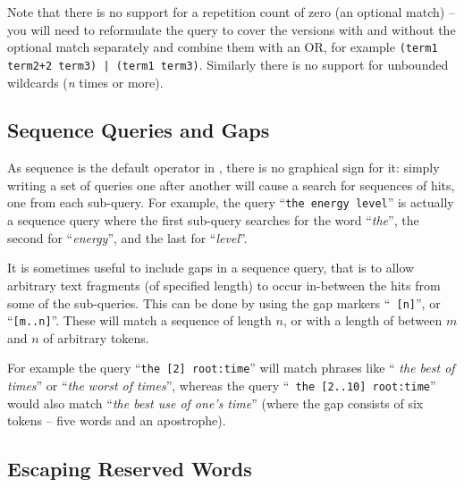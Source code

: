 Note that there is no support for a repetition count of zero (an optional
match) -- you will need to reformulate the query to cover the versions with and
without the optional match separately and combine them with an OR, for example
{\tt (term1 term2+2 term3) | (term1 term3)}.  Similarly there is no support for
unbounded wildcards ({\em n} times or more).

\subsection{Sequence Queries and Gaps}\label{sec:sequence-query}

As sequence is the default operator in \Mimir, there is no graphical sign for
it: simply writing a set of queries one after another will cause a search for
sequences of hits, one from each sub-query. For example, the query ``{\tt the
energy level}'' is actually a sequence query where the first sub-query searches
for the word ``{\it the}'', the second for ``{\it energy}'', and the last for
``{\it level}''.

It is sometimes useful to include gaps in a sequence query, that is to allow
arbitrary text fragments (of specified length) to occur in-between the hits
from some of the sub-queries. This can be done by using the gap markers ``{\tt
[n]}'', or ``{\tt [m..n]}''. These will match a sequence of length $n$, or with
a length of between $m$ and $n$ of arbitrary tokens.

For example the query ``{\tt the [2] root:time}'' will match phrases like ``{\it
the best of times}'' or ``{\it the worst of times}'', whereas the query ``{\tt
the [2..10] root:time}'' would also match ``{\it the best use of one's time}''
(where the gap consists of six tokens -- five words and an apostrophe).

\subsection{Escaping Reserved Words}

